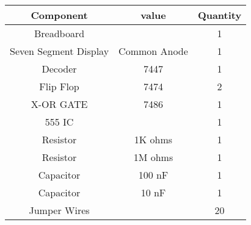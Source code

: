 \begin{tabular}{|c|c|c|}
\hline
Component	&value	&Quantity\\
\hline
Breadboard	&	&1\\
\hline
Seven Segment Display	&Common Anode	&1\\
\hline
Decoder	&7447	&1\\
\hline
Flip Flop	&7474	&2\\
\hline
X-OR GATE	&7486	&1\\
\hline
555 IC	&	&1\\
\hline
Resistor	&1K ohms	&1\\
\hline
Resistor	&1M ohms	&1\\
\hline
Capacitor	&100 nF	&1\\
\hline
Capacitor	&10 nF	&1\\
\hline
Jumper Wires	&	&20\\
\hline
\end{tabular}
